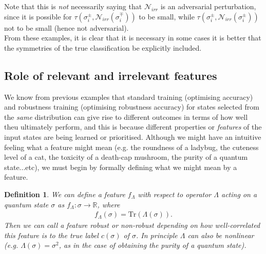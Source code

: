 \documentclass[onecolumn,prx, superscriptaddress,longbibliography,margin=1mm 11pt]{revtex4-2}
\newtheorem{definition}[theorem]{Definition}
\begin{document}
Note that this is \textit{not} necessarily saying that $\mathcal{N}_{irr}$ is an adversarial perturbation, since it is possible for $\tau(\sigma_i^{\pm}, \mathcal{N}_{irr}({\sigma}^{\mp}_i))$ to be small, while $\tau(\sigma_i^{\pm}, \mathcal{N}_{irr}({\sigma}^{\pm}_i))$ not to be small (hence not adversarial).\\

From these examples, it is clear that it is necessary in some cases it is better that the symmetries of the true classification be explicitly included. 
\subsection{Role of relevant and irrelevant features}
We know from previous examples that standard training (optimising accuracy) and robustness training (optimising robustness accuracy) for states selected from the \textit{same} distribution can give rise to different outcomes in terms of how well theu ultimately perform, and this is because different properties or \textit{features} of the input states are being learned or prioritised. Although we might have an intuitive feeling what a feature might mean (e.g. the roundness of a ladybug, the cuteness level of a cat, the toxicity of a death-cap mushroom, the purity of a quantum state...etc), we must begin by formally defining what we might mean by a feature. \\

\begin{definition} 
We can define a \textit{feature} $f_{\Lambda}$ with respect to operator $\Lambda$ acting on a quantum state $\sigma$ as $f_{\Lambda}: \sigma \rightarrow \mathbb{R}$, where 
    \begin{align}
        f_{\Lambda}(\sigma)=\text{Tr}(\Lambda(\sigma)).
    \end{align}
    Then we can call a feature robust or non-robust depending on how well-correlated this feature is to the true label $c(\sigma)$ of $\sigma$. In principle $\Lambda$ can also be nonlinear (e.g. $\Lambda(\sigma)=\sigma^2$, as in the case of obtaining the purity of a quantum state).  
    \end{definition}
\end{document}
